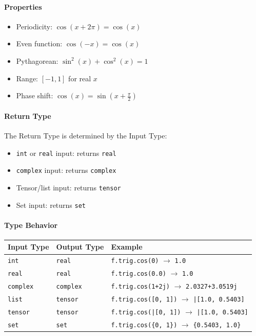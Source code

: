 \paragraph{Properties}
\begin{itemize}
\item Periodicity: $\cos(x + 2\pi) = \cos(x)$
\item Even function: $\cos(-x) = \cos(x)$
\item Pythagorean: $\sin^2(x) + \cos^2(x) = 1$
\item Range: $[-1, 1]$ for real $x$
\item Phase shift: $\cos(x) = \sin(x + \frac{\pi}{2})$
\end{itemize}

\paragraph{Return Type}
The Return Type is determined by the Input Type:
\begin{itemize}
\item \texttt{int} or \texttt{real} input: returns \texttt{real}
\item \texttt{complex} input: returns \texttt{complex}
\item Tensor/list input: returns \texttt{tensor}
\item Set input: returns \texttt{set}
\end{itemize}

\paragraph{Type Behavior}
\begin{center}
\begin{tabular}{lll}
\textbf{Input Type} & \textbf{Output Type} & \textbf{Example} \\ \hline
\texttt{int} & \texttt{real} & \texttt{f.trig.cos(0)} $\to$ \texttt{1.0} \\
\texttt{real} & \texttt{real} & \texttt{f.trig.cos(0.0)} $\to$ \texttt{1.0} \\
\texttt{complex} & \texttt{complex} & \texttt{f.trig.cos(1+2j)} $\to$ \texttt{2.0327+3.0519j} \\
\texttt{list} & \texttt{tensor} & \texttt{f.trig.cos([0, 1])} $\to$ \texttt{|[1.0, 0.5403]} \\
\texttt{tensor} & \texttt{tensor} & \texttt{f.trig.cos(|[0, 1])} $\to$ \texttt{|[1.0, 0.5403]} \\
\texttt{set} & \texttt{set} & \texttt{f.trig.cos(\{0, 1\})} $\to$ \texttt{\{0.5403, 1.0\}} \\
\end{tabular}
\end{center}

